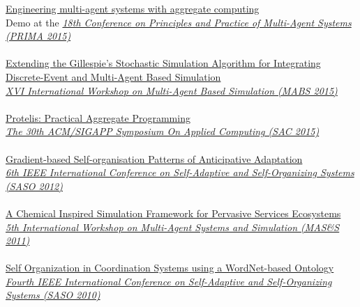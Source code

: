 \documentclass[10pt]{article}
\newcommand{\halfblankline}{\quad\vspace{-0.5\baselineskip}\pagebreak[3]}
\begin{document}
\href{http://apice.unibo.it/xwiki/bin/download/PRIMA2015/Demos/Pianini.pdf}{Engineering multi-agent systems with aggregate computing} \\
Demo at the \href{http://apice.unibo.it/xwiki/bin/view/PRIMA2015/Demos}{\textit{18th Conference on Principles and Practice of Multi-Agent Systems (PRIMA 2015)}}
\\ \halfblankline \\
\href{https://www.slideshare.net/DanySK/extending-the-gillespies-stochastic-simulation-algorithm-for-integrating-discreteevent-and-multiagent-based-simulation}{Extending the Gillespie's Stochastic Simulation Algorithm for Integrating Discrete-Event and Multi-Agent Based Simulation} \\
\href{http://www.springer.com/gp/book/9783319314464}{\textit{XVI International Workshop on Multi-Agent Based Simulation (MABS 2015)}}
\\ \halfblankline \\
\href{https://www.slideshare.net/DanySK/sac-47194849}{Protelis: Practical Aggregate Programming} \\
\href{https://www.sigapp.org/sac/sac2015/}{\textit{The 30th ACM/SIGAPP Symposium On Applied Computing (SAC 2015)}}
\\ \halfblankline \\
\href{https://www.slideshare.net/DanySK/gradientbased-selforganisation-patterns-of-anticipative-adaptation}{Gradient-based Self-organisation Patterns of Anticipative Adaptation} \\
\href{http://saso2012.univ-lyon1.fr/}{\textit{6th IEEE International Conference on Self-Adaptive and Self-Organizing Systems (SASO 2012)}}
\\ \halfblankline \\
\href{http://apice.unibo.it/xwiki/bin/view/Talks/PianiniMass2011}{A Chemical Inspired Simulation Framework for Pervasive Services Ecosystems} \\
\href{https://fedcsis.org/2011/}{\textit{5th International Workshop on Multi-Agent Systems and Simulation (MAS\&S 2011)}}
\\ \halfblankline \\
\href{http://apice.unibo.it/xwiki/bin/view/Talks/PianiniVirrusoSASO10}{Self Organization in Coordination Systems using a WordNet-based Ontology} \\
\href{http://www.inf.u-szeged.hu/projectdirs/saso10/}{\textit{Fourth IEEE International Conference on Self-Adaptive and Self-Organizing Systems (SASO 2010)}}
\end{document}
